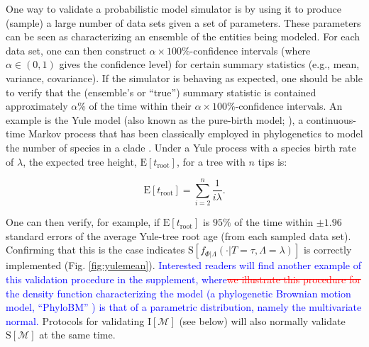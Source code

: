 \documentclass[oneside]{article}
\begin{document}
One way to validate a probabilistic model simulator is by using it to produce (sample) a large number of data sets given a set of parameters.
These parameters can be seen as characterizing an ensemble of the entities being modeled.
For each data set, one can then construct $\alpha \times 100 \%$-confidence intervals (where $\alpha \in (0,1)$ gives the confidence level) for certain summary statistics (e.g., mean, variance, covariance).
If the simulator is behaving as expected, one should be able to verify that the (ensemble's or ``true'') summary statistic is contained approximately $\alpha$\% of the time within their $\alpha \times 100\%$-confidence intervals.
An example is the Yule model (also known as the pure-birth model; \citealt{yule24}), a continuous-time Markov process that has been classically employed in phylogenetics to model the number of species in a clade \citep{yule24,aldous01}.
Under a Yule process with a species birth rate of $\lambda$, the expected tree height, $\text{E}[t_{\text{root}}]$, for a tree with $n$ tips is:
\vspace{.5cm}

\begin{equation}
  \text{E}[t_{\text{root}}] = \sum_{i=2}^{n}\frac{1}{i\lambda}.
  \label{eq:yule}
\end{equation}

\noindent One can then verify, for example, if $\text{E}[t_{\text{root}}]$ is $95\%$ of the time within $\pm 1.96$ standard errors of the average Yule-tree root age (from each sampled data set).
Confirming that this is the case indicates $\text{S}[f_{\Phi|\Lambda}(\cdot|T=\tau,\Lambda=\lambda)]$ is correctly implemented (Fig. \ref{fig:yulemean}).
\textcolor{blue}{Interested readers will find another example of this validation procedure in the supplement, where}\textcolor{red}{\st{we illustrate this procedure for}} \textcolor{blue}{the density function characterizing the model (a phylogenetic Brownian motion model, ``PhyloBM'' \citealp{f73}) is that of a parametric distribution, namely the multivariate normal.}
Protocols for validating $\text{I}[\mathcal{M}]$ (see below) will also normally validate $\text{S}[\mathcal{M}]$ at the same time.
\end{document}
